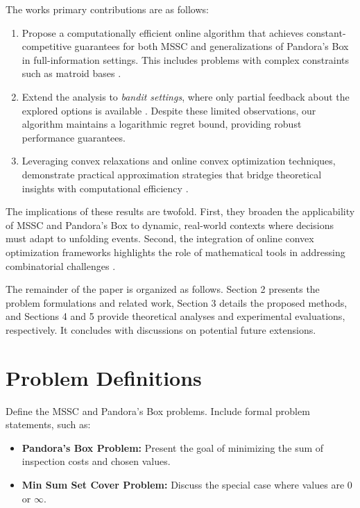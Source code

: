 \documentclass[11pt,a4paper]{article}
\begin{document}
The works primary contributions are as follows:
\begin{enumerate}
    \item Propose a computationally efficient online algorithm that achieves constant-competitive guarantees for both MSSC and generalizations of Pandora's Box in full-information settings. This includes problems with complex constraints such as matroid bases \cite{bansal2010constant}.
    \item Extend the analysis to \textit{bandit settings}, where only partial feedback about the explored options is available \cite{flaxman2004online}. Despite these limited observations, our algorithm maintains a logarithmic regret bound, providing robust performance guarantees.
    \item Leveraging convex relaxations and online convex optimization techniques, demonstrate practical approximation strategies that bridge theoretical insights with computational efficiency \cite{shalev2007primal}.
\end{enumerate}

The implications of these results are twofold. First, they broaden the applicability of MSSC and Pandora's Box to dynamic, real-world contexts where decisions must adapt to unfolding events. Second, the integration of online convex optimization frameworks highlights the role of mathematical tools in addressing combinatorial challenges \cite{gergatsouli2022online}.

The remainder of the paper is organized as follows. Section 2 presents the problem formulations and related work, Section 3 details the proposed methods, and Sections 4 and 5 provide theoretical analyses and experimental evaluations, respectively. It concludes with discussions on potential future extensions.

\section{Problem Definitions}
Define the MSSC and Pandora's Box problems. Include formal problem statements, such as:
\begin{itemize}
    \item \textbf{Pandora's Box Problem:} Present the goal of minimizing the sum of inspection costs and chosen values.
    \item \textbf{Min Sum Set Cover Problem:} Discuss the special case where values are 0 or $\infty$.
\end{itemize}
\end{document}
